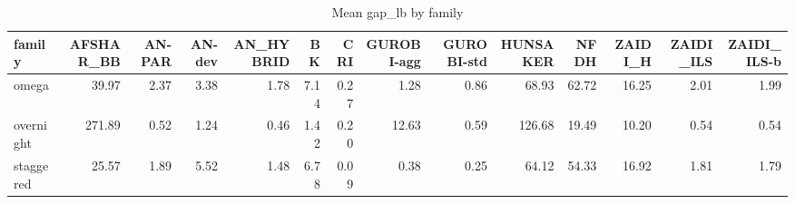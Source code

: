 \begin{table}[htbp]
\centering
\small
\caption{Mean gap\_lb by family}
\label{tab:E10a_state_of_the_art_b10_by_family}
\begin{tabular}{lrrrrrrrrrrrrr}
\toprule
family & AFSHAR\_BB & AN-PAR & AN-dev & AN\_HYBRID & BK & CRI & GUROBI-agg & GUROBI-std & HUNSAKER & NFDH & ZAIDI\_H & ZAIDI\_ILS & ZAIDI\_ILS-b \\
\midrule
omega & 39.97 & 2.37 & 3.38 & 1.78 & 7.14 & 0.27 & 1.28 & 0.86 & 68.93 & 62.72 & 16.25 & 2.01 & 1.99 \\
overnight & 271.89 & 0.52 & 1.24 & 0.46 & 1.42 & 0.20 & 12.63 & 0.59 & 126.68 & 19.49 & 10.20 & 0.54 & 0.54 \\
staggered & 25.57 & 1.89 & 5.52 & 1.48 & 6.78 & 0.09 & 0.38 & 0.25 & 64.12 & 54.33 & 16.92 & 1.81 & 1.79 \\
\bottomrule
\end{tabular}
\end{table}
